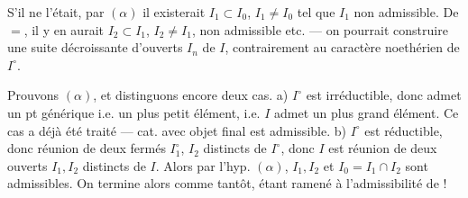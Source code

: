 S'il ne l'était, par $(\alpha)$ il existerait $I_1\subset I_0$, $I_1\ne I_0$ tel que $I_1$ non admissible. De $=$, il y en aurait $I_2\subset I_1$, $I_2\ne I_1$, non admissible etc. --- on pourrait construire une suite  décroissante d'ouverts $I_n$ de $I$, contrairement au caractère noethérien de $I^\circ$.

Prouvons $(\alpha)$, et distinguons encore deux cas. a) $I^\circ$ est irréductible, donc admet un pt générique i.e. un plus petit élément, i.e. $I$ admet un plus grand élément. Ce cas a déjà été traité  ---   cat. avec objet final est admissible. b) $I^\circ$ est réductible, donc  réunion de deux fermés $I_1^\circ$, $I_2$ distincts de $I^\circ$, donc $I$ est réunion de deux ouverts $I_1,I_2$ distincts de $I$. Alors par l'hyp.  $(\alpha)$, $I_1,I_2$  et $I_0=I_1\cap I_2$ sont admissibles. On termine alors comme tantôt, étant ramené à l'admissibilité de
!

